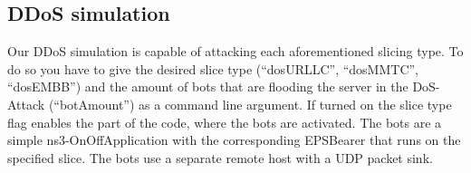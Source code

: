     \subsection{DDoS simulation}
    Our DDoS simulation is capable of attacking each aforementioned slicing type. To do so you have to give the desired slice type (``dosURLLC'', ``dosMMTC'', ``dosEMBB'') and the amount of bots that are flooding the server in the DoS-Attack (``botAmount'') as a command line argument. If turned on the slice type flag enables the part of the code, where the bots are activated. 
    The bots are a simple ns3-OnOffApplication with the corresponding EPSBearer that runs on the specified slice.
    The bots use a separate remote host with a UDP packet sink.    